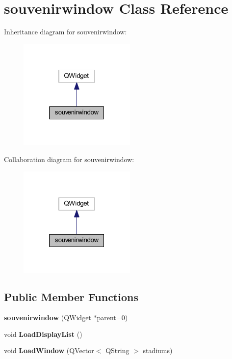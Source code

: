 \hypertarget{classsouvenirwindow}{}\section{souvenirwindow Class Reference}
\label{classsouvenirwindow}


Inheritance diagram for souvenirwindow\+:
\nopagebreak
\begin{figure}[H]
\begin{center}
\leavevmode
\includegraphics[width=163pt]{classsouvenirwindow__inherit__graph}
\end{center}
\end{figure}


Collaboration diagram for souvenirwindow\+:
\nopagebreak
\begin{figure}[H]
\begin{center}
\leavevmode
\includegraphics[width=163pt]{classsouvenirwindow__coll__graph}
\end{center}
\end{figure}
\subsection*{Public Member Functions}
\begin{DoxyCompactItemize}
\item 
\mbox{\label{classsouvenirwindow_a2209f7bf8eb395104c2106cb6432cfc2}} 
{\bfseries souvenirwindow} (Q\+Widget $\ast$parent=0)
\item 
\mbox{\label{classsouvenirwindow_a2032d9c7ea3a6efa9d3676057b4ca2af}} 
void {\bfseries Load\+Display\+List} ()
\item 
\mbox{\label{classsouvenirwindow_a9571a2f016d2457c2f13d46e60399907}} 
void {\bfseries Load\+Window} (Q\+Vector$<$ Q\+String $>$ stadiums)
\end{DoxyCompactItemize}



